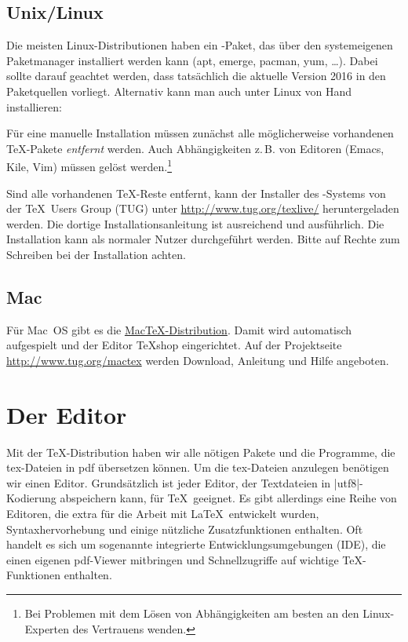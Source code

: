 \documentclass[
	ausgabe=2016-11-24,
	titel=Installationshinweise,
	shortverb=true,
]{../tex/latexkurs-exercise}
\begin{document}
\subsection*{Unix/Linux}
Die meisten Linux-Distributionen haben ein \TeXlive-Paket, das über den systemeigenen Paketmanager installiert werden kann (apt, emerge, pacman, yum, …).
Dabei sollte darauf geachtet werden, dass tatsächlich die aktuelle Version 2016 in den Paketquellen vorliegt. Alternativ kann man \TeXlive auch unter Linux von Hand installieren:

Für eine manuelle Installation müssen zunächst alle möglicherweise vorhandenen \TeX-Pakete \emph{entfernt} werden. Auch Abhängigkeiten z.\,B. von Editoren (Emacs, Kile, Vim) müssen gelöst werden.\footnote{Bei Problemen mit dem Lösen von Abhängigkeiten am besten an den Linux-Experten des Vertrauens wenden.}

Sind alle vorhandenen \TeX-Reste entfernt, kann der Installer des \TeXlive-Systems von der \TeX\ Users Group (TUG) unter \url{http://www.tug.org/texlive/} heruntergeladen werden. Die dortige Installationsanleitung ist ausreichend und ausführlich. Die Installation kann als normaler Nutzer durchgeführt werden. Bitte auf Rechte zum Schreiben bei der Installation achten.


\subsection*{Mac}
Für Mac~OS gibt es die \href{http://www.tug.org/mactex}{Mac\TeX-Distribution}. Damit wird automatisch  \TeXlive aufgespielt und  der Editor \TeX shop eingerichtet. Auf der Projektseite \url{http://www.tug.org/mactex} werden Download, Anleitung und Hilfe angeboten.


\newpage

\section{Der Editor}

Mit der \TeX-Distribution haben wir alle nötigen Pakete und die Programme, die tex-Dateien in pdf übersetzen können. Um die tex-Dateien anzulegen benötigen wir einen Editor. Grundsätzlich ist jeder Editor, der Textdateien in |utf8|-Kodierung abspeichern kann, für \TeX\ geeignet. Es gibt allerdings eine Reihe von Editoren, die extra für die Arbeit mit \LaTeX\ entwickelt wurden, Syntaxhervorhebung und einige nützliche Zusatzfunktionen enthalten. Oft handelt es sich um sogenannte integrierte Entwicklungsumgebungen (IDE), die einen eigenen pdf-Viewer mitbringen und Schnellzugriffe auf wichtige \TeX-Funktionen enthalten.
\end{document}
